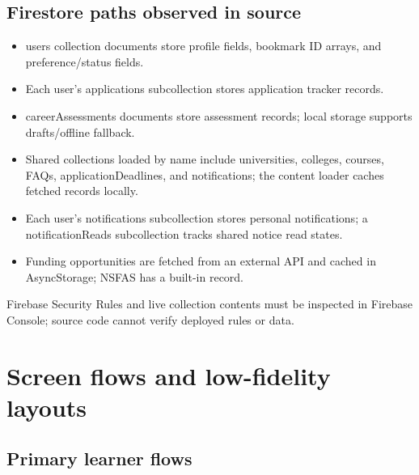 \documentclass[11pt,a4paper]{article}
\begin{document}
\subsection{Firestore paths observed in source}
\begin{itemize}
\item users collection documents store profile fields, bookmark ID arrays, and preference/status fields.
\item Each user's applications subcollection stores application tracker records.
\item careerAssessments documents store assessment records; local storage supports drafts/offline fallback.
\item Shared collections loaded by name include universities, colleges, courses, FAQs, applicationDeadlines, and notifications; the content loader caches fetched records locally.
\item Each user's notifications subcollection stores personal notifications; a notificationReads subcollection tracks shared notice read states.
\item Funding opportunities are fetched from an external API and cached in AsyncStorage; NSFAS has a built-in record.
\end{itemize}
Firebase Security Rules and live collection contents must be inspected in Firebase Console; source code cannot verify deployed rules or data.

\section{Screen flows and low-fidelity layouts}
\subsection{Primary learner flows}
\begin{center}
\end{center}
\end{document}

